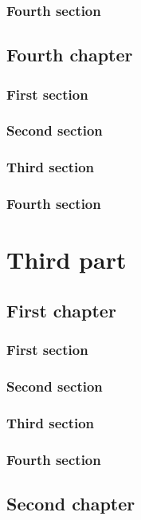 \documentclass{researchbook}
\begin{document}
\section{Fourth section}\lipsum


\chapter{Fourth chapter}

\section{First section}\lipsum
\section{Second section}\lipsum
\section{Third section}\lipsum
\section{Fourth section}\lipsum


\part{Third part}
\chapter{First chapter}

\section{First section}\lipsum
\section{Second section}\lipsum
\section{Third section}\lipsum
\section{Fourth section}\lipsum


\chapter{Second chapter}
\end{document}
